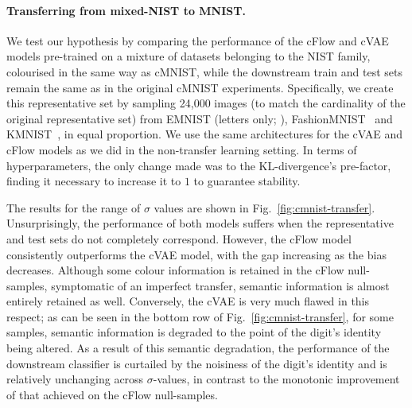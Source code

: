 \paragraph{Transferring from mixed-NIST to MNIST.}
%
We test our hypothesis by comparing the performance of the \ac{cFlow} and \ac{cVAE} models pre-trained on a
mixture of datasets belonging to the NIST family, colourised in the same way as cMNIST, while the
downstream train and test sets remain the same as in the original cMNIST experiments. 
%
Specifically, we create this representative set by sampling 24,000 images (to match the cardinality
of the original representative set) from EMNIST (letters only; \citealp{cohen2017emnist}),
Fashion\-MNIST~\citep{xiao2017fashion} and KMNIST~\citep{clanuwat2018deep}, in equal proportion. 
%
We use the same architectures for the \ac{cVAE} and \ac{cFlow} models as we did in the non-transfer learning
setting. 
%
In terms of hyperparameters, the only change made was to the KL-divergence's pre-factor, finding it
necessary to increase it to $1$ to guarantee stability.

The results for the range of $\sigma$ values are shown in Fig.~\ref{fig:cmnist-transfer}.
%
Unsurprisingly, the performance of both models suffers when the representative and test sets do not
completely correspond. 
%
However, the \ac{cFlow} model consistently outperforms the \ac{cVAE} model, with the gap increasing as the
bias decreases. 
%
Although some colour information is retained in the \ac{cFlow} null-samples, symptomatic of an imperfect
transfer, semantic information is almost entirely retained as well. 
%
Conversely, the \ac{cVAE} is very much flawed in this respect; as can be seen in the bottom row of
Fig.~\ref{fig:cmnist-transfer}, for some samples, semantic information is degraded to the point of
the digit's identity being altered. 
%
As a result of this semantic degradation, the performance of the downstream classifier is curtailed
by the noisiness of the digit's identity and is relatively unchanging across $\sigma$-values, in
contrast to the monotonic improvement of that achieved on the \ac{cFlow} null-samples.



% 
% 


% 
